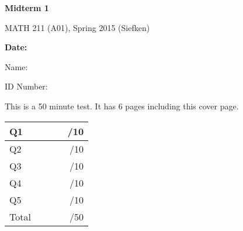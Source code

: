 \documentclass{article}
\begin{document}
	
	{\huge \bf Midterm 1} 
	
	\vspace{2em}
	{\huge MATH 211 (A01), Spring 2015 (Siefken)}
	
	\vspace{2em}
 	{
	\hfill \bf Date: \underline{\hspace{6em}}
	\vspace{.5em}

	\hfill Name: \underline{\hspace{16em}}
	\vspace{.5em}

	\hfill ID Number: \underline{\hspace{16em}}
	
	}

	\vspace{2in}
	This is a 50 minute test. It has 6 pages including this cover page.
	\begin{center}
	\begin{tabular}{|l|c|r|}
	\hline
	Q1 & $\phantom{abcd}$ & /10\\
	\hline
	Q2 & & /10\\
	\hline
	Q3 & & /10\\
	\hline
	Q4 & & /10\\
	\hline
	Q5 & & /10\\
	\hline
	\hline
	Total & & /50\\
	\hline
	\end{tabular}
	\end{center}
	\clearpage
\end{document}
